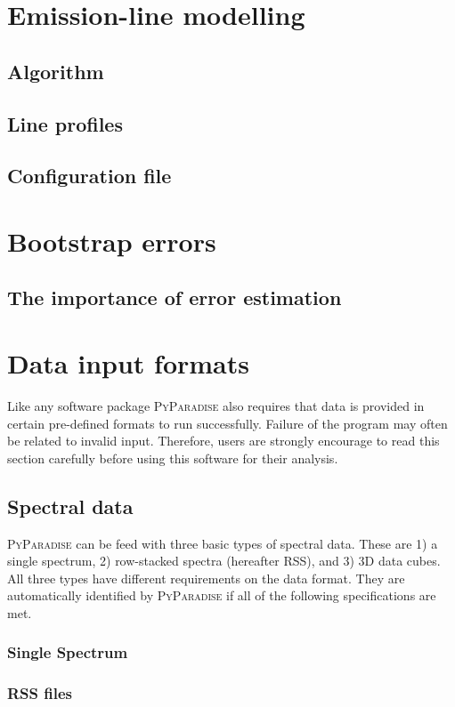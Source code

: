\documentclass[usenatbib,usegraphicx,useAMS]{mn2e}
\begin{document}
\section{Emission-line modelling}
\subsection{Algorithm}
\subsection{Line profiles}
\subsection{Configuration file}

\section{Bootstrap errors}
\subsection{The importance of error estimation}

\section{Data input formats}
Like any software package \textsc{PyParadise} also requires that data is provided in certain pre-defined formats to run successfully. Failure of the program may often be related to invalid input. 
Therefore, users are strongly encourage to read this section carefully before using this software for their analysis. 
\subsection{Spectral data}
\textsc{PyParadise} can be feed with three basic types of spectral data. These are 1) a single spectrum, 2) row-stacked spectra (hereafter RSS), and 3) 3D data cubes. All three types have different 
requirements on the data format. They are automatically identified by \textsc{PyParadise} if all of the following specifications are met.
\subsubsection{Single Spectrum}
\subsubsection{RSS files}
\end{document}
